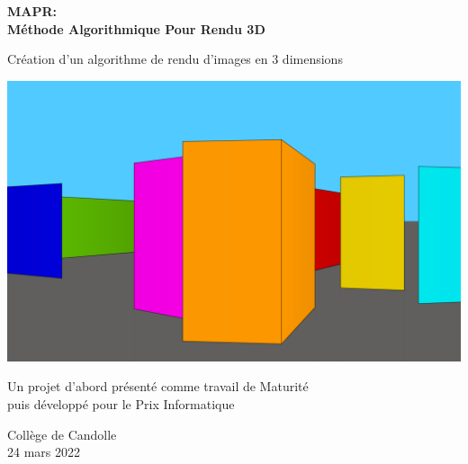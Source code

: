 \begin{titlepage}
	\begin{center}
		\vspace*{1cm}

		\Huge
		\textbf{MAPR: \\ Méthode Algorithmique Pour Rendu 3D}

		\vspace{0.5cm}
		\LARGE
		Création d’un algorithme de rendu d’images en 3 dimensions 

		\vspace{1.5cm}

		\textbf{\myauthor}

		\includegraphics{../img/CoverPic/Main_Pic4.png}

		\vfill
		Un projet d'abord présenté comme travail de Maturité \\
		puis développé pour le Prix Informatique
				
		\vspace{0.8cm}
		
		\Large
		Collège de Candolle \\
		24 mars 2022
	\end{center}
\end{titlepage}



\thispagestyle{empty}
